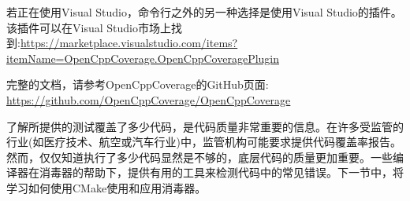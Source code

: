 若正在使用Visual Studio，命令行之外的另一种选择是使用Visual Studio的插件。该插件可以在Visual Studio市场上找到:\url{https://marketplace.visualstudio.com/items?itemName=OpenCppCoverage.OpenCppCoveragePlugin}

完整的文档，请参考OpenCppCoverage的GitHub页面:
\url{https://github.com/OpenCppCoverage/OpenCppCoverage}

了解所提供的测试覆盖了多少代码，是代码质量非常重要的信息。在许多受监管的行业(如医疗技术、航空或汽车行业)中，监管机构可能要求提供代码覆盖率报告。然而，仅仅知道执行了多少代码显然是不够的，底层代码的质量更加重要。一些编译器在消毒器的帮助下，提供有用的工具来检测代码中的常见错误。下一节中，将学习如何使用CMake使用和应用消毒器。

























